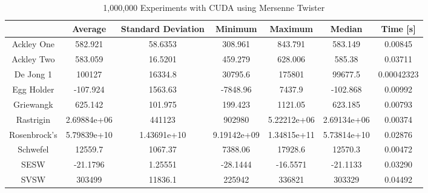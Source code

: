 \documentclass{article}
\begin{document}
        \begin{table}[h!]
            \begin{centering}
                \begin{tabular}{|c||c|c|c|c|c|c|}
                    \hline
                                & Average & Standard Deviation & Minimum & Maximum & Median & Time [s] \\
                    \hline
                    \hline
                    Ackley One & 582.921 & 58.6353 & 308.961 & 843.791 & 583.149 & 0.00845 \\
                    \hline
                    Ackley Two & 583.059 & 16.5201 & 459.279 & 628.006 & 585.38 & 0.03711 \\
                    \hline
                    De Jong 1 & 100127 & 16334.8 & 30795.6 & 175801 & 99677.5 & 0.00042323\\
                    \hline
                    Egg Holder & -107.924 & 1563.63 & -7848.96 & 7437.9 & -102.868 & 0.00992 \\
                    \hline
                    Griewangk & 625.142 & 101.975 & 199.423 & 1121.05 & 623.185 & 0.00793 \\
                    \hline
                    Rastrigin & 2.69884e+06 & 441123 & 902980 & 5.22212e+06 & 2.69134e+06 & 0.00374 \\
                    \hline
                    Rosenbrock's & 5.79839e+10 & 1.43691e+10 & 9.19142e+09 & 1.34815e+11 & 5.73814e+10 & 0.02876 \\
                    \hline
                    Schwefel & 12559.7 & 1067.37 & 7388.06 & 17928.6 & 12570.3 & 0.00472\\
                    \hline
                    SESW & -21.1796 & 1.25551 & -28.1444 & -16.5571 & -21.1133 & 0.03290 \\
                    \hline
                    SVSW & 303499 & 11836.1 & 225942 & 336821 & 303329 & 0.04492 \\
                    \hline
                \end{tabular}
                \caption{1,000,000 Experiments with CUDA using Mersenne Twister}
            \end{centering}
            \end{table}
\end{document}
